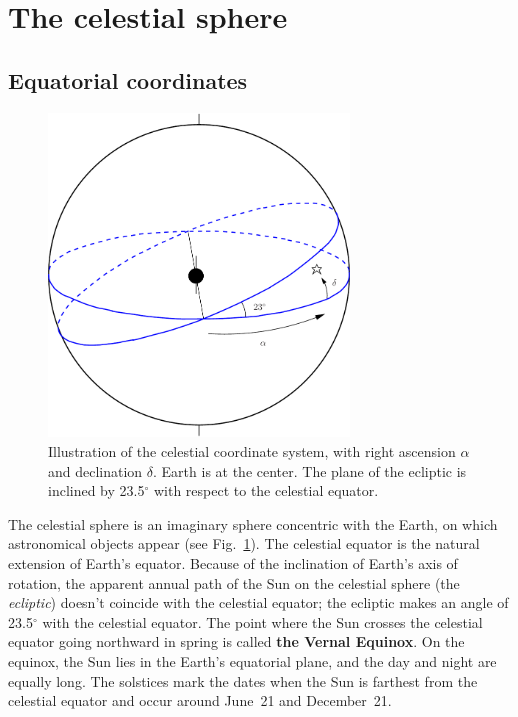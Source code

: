 \section{The celestial sphere}

\subsection{Equatorial coordinates}

\begin{figure}[ht]
\begin{center}
\includegraphics[width=8cm]{../figures/celestial.pdf}
\end{center}
\caption{Illustration of the celestial coordinate system, with right ascension $\alpha$ 
and declination $\delta$. 
Earth is at the center. The plane of the ecliptic is inclined by 23.5$^\circ$ with 
respect to the celestial equator. }
\label{figcelest}
\end{figure}

The celestial sphere is an imaginary sphere concentric with the Earth, on which
astronomical objects appear (see Fig.~\ref{figcelest}). 
The celestial equator is the
natural extension of Earth's equator. Because of the inclination of 
Earth's axis of rotation, the apparent annual path of the Sun
on the celestial sphere (the {\em ecliptic}) doesn't  coincide with the 
celestial equator; the ecliptic makes an angle of 23.5$^\circ$
with the celestial equator. The point where the Sun crosses the
celestial
equator going northward in spring is called {\bf the Vernal 
Equinox}. 
On the equinox, the Sun lies
in the Earth's equatorial plane, and the day and night are equally
long. The solstices mark the dates when the Sun is farthest from 
the celestial equator and occur around June~21 and December~21. 

